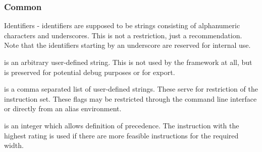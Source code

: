 \subsubsection{Common}
\begin{description}
  \item Identifiers - identifiers are supposed to be strings consisting of alphanumeric characters and underscores. This is not a restriction, just a recommendation. Note that the identifiers starting by an underscore are reserved for internal use.
  \item {} is an arbitrary user-defined string. This is not used by the framework at all, but is preserved for potential debug purposes or for export.
  \item {} is a comma separated list of user-defined strings. These serve for restriction of the instruction set. These flags may be restricted through the command line interface or directly from an alias environment.
  \item {} is an integer which allows definition of precedence. The instruction with the highest rating is used if there are more feasible instructions for the required width.
\end{description}

